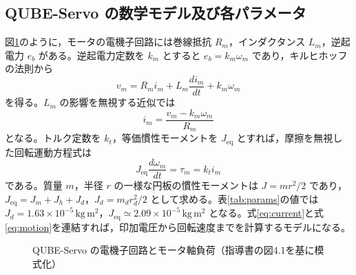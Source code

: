 \documentclass[dvipdfmx,a4paper,11pt]{jsarticle}
\begin{document}
\subsection{QUBE-Servo の数学モデル及び各パラメータ}
図\ref{fig:motor}のように，モータの電機子回路には巻線抵抗 $R_m$，インダクタンス $L_m$，逆起電力 $e_b$ がある。逆起電力定数を $k_m$ とすると $e_b=k_m\omega_m$ であり，キルヒホッフの法則から
\begin{equation}
 v_m=R_m i_m+L_m\frac{di_m}{dt}+k_m\omega_m
 \label{eq:electrical}
\end{equation}
を得る。$L_m$ の影響を無視する近似では
\begin{equation}
 i_m=\frac{v_m-k_m\omega_m}{R_m}
 \label{eq:current}
\end{equation}
となる。トルク定数を $k_t$，等価慣性モーメントを $J_{\mathrm{eq}}$ とすれば，摩擦を無視した回転運動方程式は
\begin{equation}
 J_{\mathrm{eq}}\frac{d\omega_m}{dt}=\tau_m=k_t i_m
 \label{eq:motion}
\end{equation}
である。質量 $m$，半径 $r$ の一様な円板の慣性モーメントは $J=mr^2/2$ であり，$J_{\mathrm{eq}}=J_m+J_h+J_d$，$J_d=m_dr_d^2/2$ として求める。表\ref{tab:params}の値では $J_d=1.63\times10^{-5}\,\mathrm{kg\,m^2}$，$J_{\mathrm{eq}}\simeq2.09\times10^{-5}\,\mathrm{kg\,m^2}$ となる。式\eqref{eq:current}と式\eqref{eq:motion}を連結すれば，印加電圧から回転速度までを計算するモデルになる。
\begin{figure}[htbp]\centering
{}
\caption{QUBE-Servo の電機子回路とモータ軸負荷（指導書の図4.1を基に模式化）}\label{fig:motor}
\end{figure}
\end{document}
